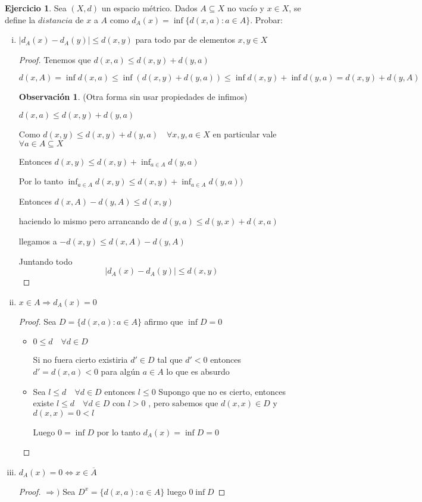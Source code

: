 \documentclass[12pt]{report}
\newcommand{\Ra}{\Rightarrow}
\newcommand{\ol}{\overline}
\theoremstyle{definition}
\newtheorem*{remark}{Observación}
\newtheorem{ej}{Ejercicio}
\begin{document}
\begin{ej}
  Sea $(X,d)$ un espacio métrico. Dados $A \subseteq X$ no vacío y $x \in X$, se define la $distancia$ de $x$ a $A$ como $d_A(x) = \inf{\{d(x,a):a\in A \}}$. Probar:
  \begin{enumerate}[i.]
    \item $|d_A(x) - d_A(y)| \leq d(x,y)$ para todo par de elementos $x,y \in X$
      \begin{proof}
	Tenemos que $d(x,a) \leq d(x,y) + d(y,a)$ 

	$d(x,A)  = \inf d(x,a) \leq \inf (d(x,y) + d(y,a)) \leq \inf d(x,y) + \inf d(y,a) = d(x,y) + d(y,A)$

	\begin{remark}
		(Otra forma sin usar propiedades de infimos)

	$d(x,a) \leq d(x,y) + d(y,a)$

	Como  $ d(x,y) \leq d(x,y) + d(y,a)\quad \forall x,y,a \in X$ en particular vale $\forall a \in A\subseteq X$ 

	Entonces $  d(x,y) \leq d(x,y) + \inf_{a \in A}d(y,a)$

	Por lo tanto $\inf_{a \in A} d(x,y) \leq d(x,y) + \inf_{a \in A}d(y,a)) $
\end{remark}
	Entonces $d(x,A) - d(y,A) \leq d(x,y)$

	haciendo lo mismo pero arrancando de $d(y,a) \leq d(y,x) + d(x,a)$

	llegamos a $- d(x,y) \leq d(x,A) - d(y,A)$

	Juntando todo
	$$ |d_A(x) - d_A(y) | \leq d(x,y) $$
      \end{proof} 
    \item $x \in A \Ra d_A(x)=0$
      \begin{proof}
	Sea $D = \{d(x,a) : a \in A\}$ afirmo que $\inf D = 0$
	\begin{itemize}
	  \item $0 \leq d \quad \forall d \in D$ 

	    Si no fuera cierto existiria $d' \in D$ tal que $d' < 0$ entonces $d' = d(x,a) < 0$ para algún $a \in A$ lo que es absurdo
	  \item Sea $l \leq d \quad \forall d \in D $ entonces $l \leq 0$ Supongo que no es cierto, entonces existe $l \leq d \quad \forall d \in D$ con $l > 0$ , pero sabemos que $d(x,x) \in D$ y $d(x,x) = 0 < l$

	    Luego $0 = \inf D$ por lo tanto $d_{A}(x) = \inf D = 0$ 
	  \end{itemize}
	  \end{proof}
	\item $d_A(x) = 0 \iff x \in \ol A$
	  \begin{proof}
	  $\Ra )$ Sea $D^x = \{d(x,a):a\in A\}$ luego $0 \inf D$ 


\end{proof}
\end{enumerate}
\end{ej}
\end{document}
